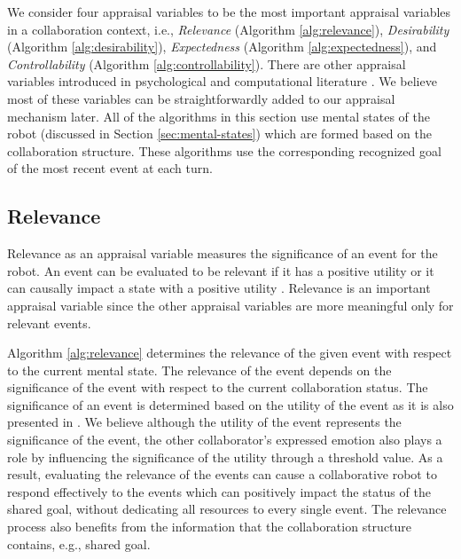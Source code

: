 \documentclass{aamas2016}
\begin{document}
We consider four appraisal variables to be the most important appraisal
variables in a collaboration context, i.e., \textit{Relevance} (Algorithm
\ref{alg:relevance}), \textit{Desirability} (Algorithm \ref{alg:desirability}),
\textit{Expectedness} (Algorithm \ref{alg:expectedness}), and
\textit{Controllability} (Algorithm \ref{alg:controllability}). There are other
appraisal variables introduced in psychological
\cite{scherer:appraisal-processes} and computational literature
\cite{gratch:domain-independent}. We believe most of these variables can be
straightforwardly added to our appraisal mechanism later. All of the algorithms
in this section use mental states of the robot (discussed in Section
\ref{sec:mental-states}) which are formed based on the collaboration structure.
These algorithms use the corresponding recognized goal of the most recent event
at each turn.

\subsection{Relevance}

Relevance as an appraisal variable measures the significance of an event for the
robot. An event can be evaluated to be relevant if it has a positive utility or
it can causally impact a state with a positive utility
\cite{marsella:ema-process-model}. Relevance is an important appraisal variable
since the other appraisal variables are more meaningful only for relevant
events.

Algorithm \ref{alg:relevance} determines the relevance of the given event with
respect to the current mental state. The relevance of the event depends on the
significance of the event with respect to the current collaboration status.
The significance of an event is determined based on the utility of the event as
it is also presented in
\cite{gratch:domain-independent,marsella:ema-process-model}. We believe although
the utility of the event represents the significance of the event, the other
collaborator's expressed emotion also plays a role by influencing the
significance of the utility through a threshold value. As a result, evaluating
the relevance of the events can cause a collaborative robot to respond
effectively to the events which can positively impact the status of the shared
goal, without dedicating all resources to every single event. The relevance
process also benefits from the information that the collaboration structure
contains, e.g., shared goal.
\end{document}
